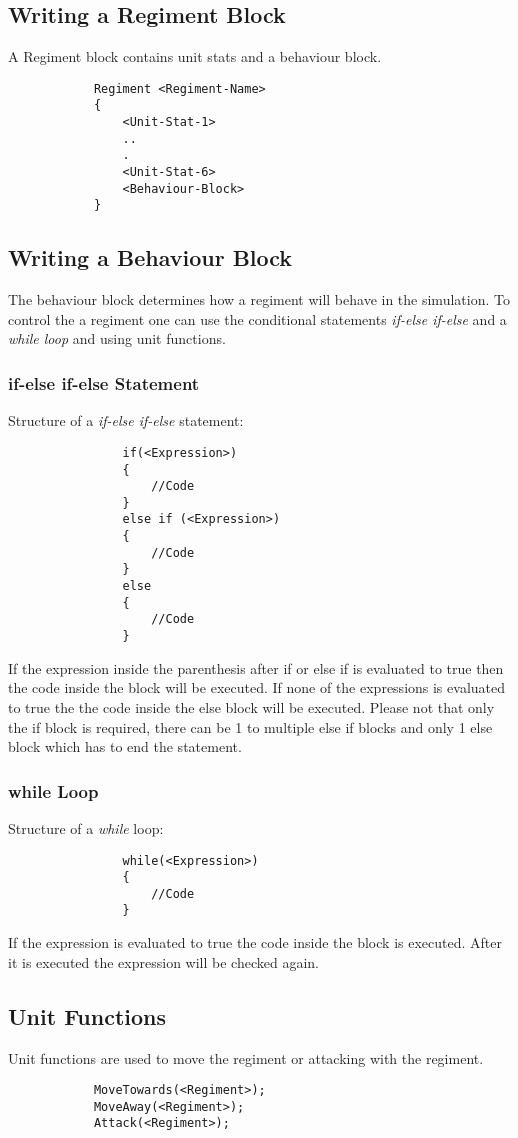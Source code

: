 	\subsection{Writing a Regiment Block}
		A Regiment block contains unit stats and a behaviour block.
		\begin{verbatim}
			Regiment <Regiment-Name>
			{
				<Unit-Stat-1>
				..
				.
				<Unit-Stat-6>
				<Behaviour-Block>
			}
		\end{verbatim}
	\subsection{Writing a Behaviour Block}
		The behaviour block determines how a regiment will behave in the simulation. To control the a regiment one can 
		use the conditional statements {\it if-else if-else} and a {\it while loop} and using unit functions.
		\subsubsection{if-else if-else Statement}
			Structure of a {\it if-else if-else} statement: \\
			\begin{verbatim}
				if(<Expression>)
				{
					//Code
				}
				else if (<Expression>)
				{
					//Code
				}
				else
				{
					//Code
				}
			\end{verbatim}
			If the expression inside the parenthesis after if or else if is evaluated to true then the code inside the block will be executed.
			If none of the expressions is evaluated to true the the code inside the else block will be executed. Please not that only the if block
			is required, there can be 1 to multiple else if blocks and only 1 else block which has to end the statement. \\
		\subsubsection{while Loop}
			Structure of a {\it while} loop: \\			
			\begin{verbatim}
				while(<Expression>)
				{
					//Code
				}
			\end{verbatim}
			If the expression is evaluated to true the code inside the block is executed. After it is executed the expression will be checked again.
	\subsection{Unit Functions}
		Unit functions are used to move the regiment or attacking with the regiment.
		\begin{verbatim}
			MoveTowards(<Regiment>);
			MoveAway(<Regiment>);
			Attack(<Regiment>);
		\end{verbatim}
